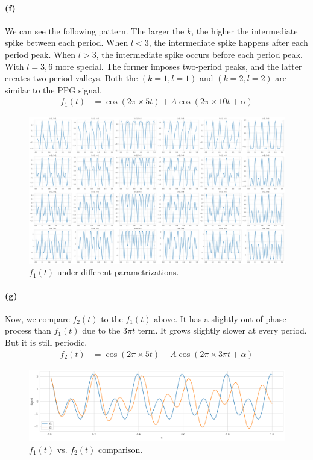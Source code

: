 \documentclass[11pt, letterpaper]{article}
\begin{document}
\paragraph{(f)}
We can see the following pattern. The larger the $k$, the higher the intermediate spike between each period. When $l < 3$, the intermediate spike happens after each period peak. When $l > 3$, the intermediate spike occurs before each period peak. With $l = {3, 6}$ more special. The former imposes two-period peaks, and the latter creates two-period valleys. Both the $(k=1, l=1)$ and $(k=2, l=2)$ are similar to the PPG signal.
\begin{align*}
    f_1(t) &= \cos(2\pi \times 5t) + A\cos(2\pi \times 10t + \alpha)
\end{align*}
\begin{figure}[!h]
  \centering
  \includegraphics[width=1.0\textwidth]{plot7.png}
  \captionsetup{justification=centering}
  \caption{$f_1(t)$ under different parametrizations.}
  \label{fig:f1t_kl_parametrization}
\end{figure}

\newpage
\paragraph{(g)}
Now, we compare $f_2(t)$ to the $f_1(t)$ above. It has a slightly out-of-phase process than $f_1(t)$ due to the $3\pi t$ term. It grows slightly slower at every period. But it is still periodic.
\begin{align*}
    f_2(t) &= \cos(2\pi \times 5t) + A\cos(2\pi \times 3\pi t + \alpha)
\end{align*}
\begin{figure}[!h]
  \centering
  \includegraphics[width=1.0\textwidth]{plot8.png}
  \captionsetup{justification=centering}
  \caption{$f_1(t)$ vs. $f_2(t)$ comparison.}
  \label{fig:f1_vs_f2}
\end{figure}
\end{document}
